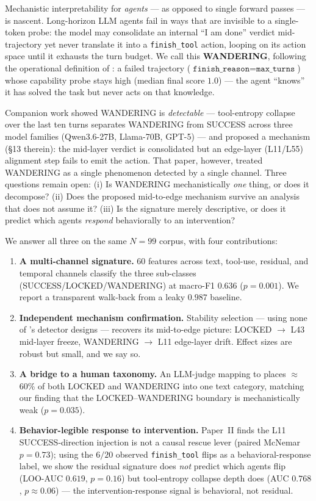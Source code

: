 \documentclass[11pt]{article}
\begin{document}
Mechanistic interpretability for \emph{agents} --- as opposed to single forward passes --- is nascent. Long-horizon LLM agents fail in ways that are invisible to a single-token probe: the model may consolidate an internal ``I am done'' verdict mid-trajectory yet never translate it into a \texttt{finish\_tool} action, looping on its action space until it exhausts the turn budget. We call this \textbf{WANDERING}, following the operational definition of \cite{toolentropy2026}: a failed trajectory ($\texttt{finish\_reason}{=}\texttt{max\_turns}$) whose capability probe stays high (median final score $1.0$) --- the agent ``knows'' it has solved the task but never acts on that knowledge.

Companion work \cite{toolentropy2026} showed WANDERING is \emph{detectable} --- tool-entropy collapse over the last ten turns separates WANDERING from SUCCESS across three model families (Qwen3.6-27B, Llama-70B, GPT-5) --- and proposed a mechanism (\S13 therein): the mid-layer verdict is consolidated but an edge-layer (L11/L55) alignment step fails to emit the action. That paper, however, treated WANDERING as a single phenomenon detected by a single channel. Three questions remain open: (i) Is WANDERING mechanistically \emph{one} thing, or does it decompose? (ii) Does the proposed mid-to-edge mechanism survive an analysis that does not assume it? (iii) Is the signature merely descriptive, or does it predict which agents \emph{respond} behaviorally to an intervention?

We answer all three on the same $N{=}99$ corpus, with four contributions:

\begin{enumerate}
\item \textbf{A multi-channel signature.} 60 features across text, tool-use, residual, and temporal channels classify the three sub-classes (SUCCESS/LOCKED/WANDERING) at macro-F1 $0.636$ ($p{=}0.001$). We report a transparent walk-back from a leaky $0.987$ baseline.
\item \textbf{Independent mechanism confirmation.} Stability selection --- using none of \cite{toolentropy2026}'s detector designs --- recovers its mid-to-edge picture: LOCKED $\to$ L43 mid-layer freeze, WANDERING $\to$ L11 edge-layer drift. Effect sizes are robust but small, and we say so.
\item \textbf{A bridge to a human taxonomy.} An LLM-judge mapping to \cite{liu2026failures} places $\approx$60\% of both LOCKED and WANDERING into one text category, matching our finding that the LOCKED--WANDERING boundary is mechanistically weak ($p{=}0.035$).
\item \textbf{Behavior-legible response to intervention.} Paper~II finds the L11 SUCCESS-direction injection is not a causal rescue lever (paired McNemar $p{=}0.73$); using the $6/20$ observed \texttt{finish\_tool} flips as a behavioral-response label, we show the residual signature does \emph{not} predict which agents flip (LOO-AUC $0.619$, $p{=}0.16$) but tool-entropy collapse depth does (AUC $0.768$, $p\approx0.06$) --- the intervention-response signal is behavioral, not residual.
\end{enumerate}
\end{document}
